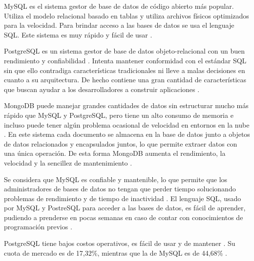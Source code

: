\documentclass{article}
\begin{document}
MySQL es el sistema gestor de base de datos de código abierto más popular. Utiliza el modelo relacional basado en tablas y utiliza archivos físicos optimizados para la velocidad. Para brindar acceso a las bases de datos se usa el lenguaje SQL. Este sistema es muy rápido y fácil de usar \parencite{whatIsMySQLOracle}.

PostgreSQL es un sistema gestor de base de datos objeto-relacional con un buen rendimiento y confiabilidad \parencite{postgreHome}. Intenta mantener conformidad con el estándar SQL sin que ello contradiga características tradicionales ni lleve a malas decisiones en cuanto a su arquitectura. De hecho contiene una gran cantidad de características que buscan ayudar a los desarrolladores a construir aplicaciones \parencite{postgreAbout}.

MongoDB puede manejar grandes cantidades de datos sin estructurar mucho más rápido que MySQL y PostgreSQL, pero tiene un alto consumo de memoria e incluso puede tener algún problema ocasional de velocidad en entornos en la nube \parencite{mongoMysqlComparison}. En este sistema cada documento se almacena en la base de datos junto a objetos de datos relacionados y encapsulados juntos, lo que permite extraer datos con una única operación. De esta forma MongoDB aumenta el rendimiento, la velocidad y la sencillez de mantenimiento \parencite{vsoftconsultingMongo}.

Se considera que MySQL es confiable y mantenible, lo que permite que los administradores de bases de datos no tengan que perder tiempo solucionando problemas de rendimiento y de tiempo de inactividad \parencite{dbquestMysql}. El lenguaje SQL, usado por MySQL y PostreSQL para acceder a las bases de datos, es fácil de aprender, pudiendo a prenderse en pocas semanas en caso de contar con conocimientos de programación previos \parencite{thinkfulSql}.

PostgreSQL tiene bajos costos operativos, es fácil de usar y de mantener \parencite{topcoderPostgresql}. Su cuota de mercado es de 17,32\%, mientras que la de MySQL es de 44,68\% \parencite{marketShareDb}.
\end{document}
